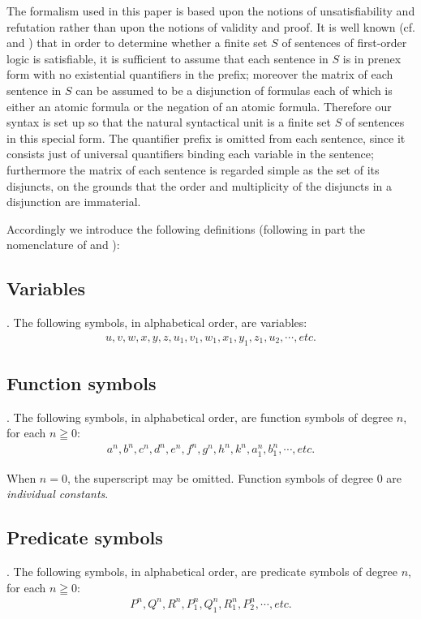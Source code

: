 \documentclass[8pt]{extarticle}
\begin{document}
The formalism used in this paper is based upon the notions of unsatisfiability and refutation rather than upon the notions of validity and proof. It is well known (cf. \cite{davis_1960} and \cite{robinson_1963}) that in order to determine whether a finite set $S$ of sentences of first-order logic is satisfiable, it is sufficient to assume that each sentence in $S$ is in prenex form with no existential quantifiers in the prefix; moreover the matrix of each sentence in $S$ can be assumed to be a disjunction of formulas each of which is either an atomic formula or the negation of an atomic formula. Therefore our syntax is set up so that the natural syntactical unit is a finite set $S$ of sentences in this special form. The quantifier prefix is omitted from each sentence, since it consists just of universal quantifiers binding each variable in the sentence; furthermore the matrix of each sentence is regarded simple as the set of its disjuncts, on the grounds that the order and multiplicity of the disjuncts in a disjunction are immaterial.

Accordingly we introduce the following definitions (following in part the nomenclature of \cite{davis_1960} and \cite{robinson_1963}):\\
\subsection{Variables}. The following symbols, in alphabetical order, are variables:
\begin{align*}
    u, v, w, x, y, z, u_1 , v_1 , w_1 , x_1 , y_1 , z_1 , u_2 , \dotsm , etc.
\end{align*}


\subsection{Function symbols}. The following symbols, in alphabetical order, are function symbols of degree $n$, for each $n\geqq0$:
\begin{align*}
    a^n,b^n,c^n,d^n,e^n,f^n,g^n,h^n,k^n,a_1^n,b_1^n,\dotsm, etc.
\end{align*}

\noindent When $n = 0$, the superscript may be omitted. Function symbols of degree 0 are \emph{individual constants}.

\subsection{Predicate symbols}. The following symbols, in alphabetical order, are predicate symbols of degree $n$, for each $n\geqq0$:
\begin{align*}
    P^n,Q^n,R^n,P_1^n,Q_1^n,R_1^n,P_2^n,\dotsm, etc.
\end{align*}
\end{document}
